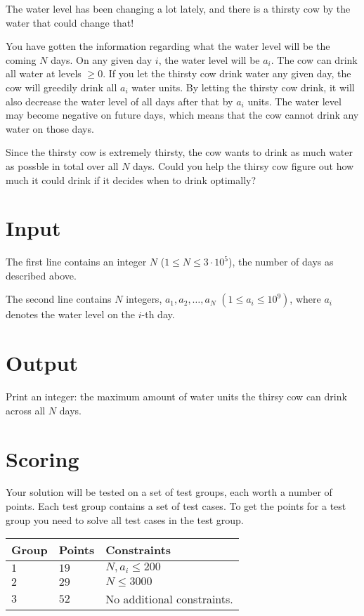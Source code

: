 
The water level has been changing a lot lately, and there is a thirsty cow by the water that could change that!

You have gotten the information regarding what the water level will be the coming $N$ days. 
On any given day $i$, the water level will be $a_i$. The cow can drink all water at levels $\geq 0$.
If you let the thirsty cow drink water any given day, the cow will greedily drink all $a_i$ water units. 
By letting the thirsty cow drink, it will also decrease the water level of all days after that by $a_i$ units. 
The water level may become negative on future days, which means that the cow cannot drink any water on those days.

Since the thirsty cow is extremely thirsty, the cow wants to drink as much water as possble in total over all $N$ days.
Could you help the thirsy cow figure out how much it could drink if it decides when to drink optimally?

\section*{Input}
The first line contains an integer $N$ ($1 \leq N \leq 3 \cdot 10^5$), the number of days as described above.

The second line contains $N$ integers, $a_1, a_2, \dots, a_N$ $(1 \leq a_i \leq 10^9)$, where $a_i$ denotes the water level on the $i$-th day.

\section*{Output}
Print an integer: the maximum amount of water units the thirsy cow can drink across all $N$ days. 

\section*{Scoring}
Your solution will be tested on a set of test groups, each worth a number of points. Each test group contains
a set of test cases. To get the points for a test group you need to solve all test cases in the test group.

\noindent
\begin{tabular}{| l | l | p{12cm} |}
  \hline
  \textbf{Group} & \textbf{Points} & \textbf{Constraints} \\ \hline
  $1$    & $19$       & $N, a_i \leq 200$ \\ \hline
  $2$    & $29$       & $N \leq 3000$ \\ \hline
  $3$    & $52$       & No additional constraints. \\ \hline
\end{tabular}


